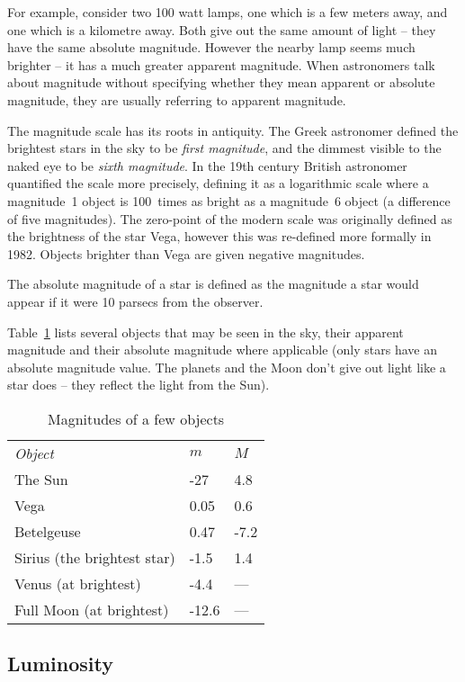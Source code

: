 For example, consider two 100 watt lamps, one which is a few meters
away, and one which is a kilometre away. Both give out the same amount
of light -- they have the same absolute magnitude. However the nearby
lamp seems much brighter -- it has a much greater apparent magnitude.
When astronomers talk about magnitude without specifying whether they
mean apparent or absolute magnitude, they are usually referring to
apparent magnitude.

The magnitude scale has its roots in antiquity. The Greek astronomer
 defined the brightest stars in the sky to be \emph{first
magnitude}, and the dimmest visible to the naked eye to be \emph{sixth
magnitude}. In the 19th century British astronomer 
quantified the scale more precisely, defining it as a logarithmic scale
where a magnitude~1 object is 100~times as bright as a magnitude~6
object (a difference of five magnitudes). The zero-point of the modern
scale was originally defined as the brightness of the star Vega, however
this was re-defined more formally in 1982\cite{landolt}. Objects brighter
than Vega are given negative magnitudes.

The absolute magnitude of a star is defined as the magnitude a star
would appear if it were 10 parsecs from the observer.

Table~\ref{tab:Concepts:Magnitudes} lists several objects that may be seen
in the sky, their apparent magnitude and their absolute magnitude where
applicable (only stars have an absolute magnitude value. The planets and
the Moon don't give out light like a star does -- they reflect the light
from the Sun).

\begin{table}[htb]
  \centering
\begin{longtable}[c]{@{}lll@{}}
\toprule
\emph{Object} & $m$ & $M$\tabularnewline
The Sun & -27 & 4.8\tabularnewline
Vega & 0.05 & 0.6\tabularnewline
Betelgeuse & 0.47 & -7.2\tabularnewline
Sirius (the brightest star) & -1.5 & 1.4\tabularnewline
Venus (at brightest) & -4.4 & ---\tabularnewline
Full Moon (at brightest) & -12.6 & ---\tabularnewline
\bottomrule
\end{longtable}
  \caption{Magnitudes of a few objects}
  \label{tab:Concepts:Magnitudes}
\end{table}


\subsection{Luminosity}
\label{sec:Concepts:Luminosity}

